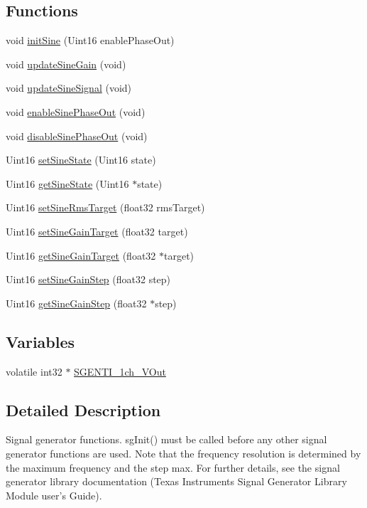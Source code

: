 \subsection*{Functions}
\begin{DoxyCompactItemize}
\item 
void \hyperlink{a00045_a4c050cf5f44fdac62f2260da4d5d6c32}{init\-Sine} (Uint16 enable\-Phase\-Out)
\item 
void \hyperlink{a00045_a5cd2ce3a0a44bf15cce989d0ec28483c}{update\-Sine\-Gain} (void)
\item 
void \hyperlink{a00045_a15cc3f7f606ea48016c591c798a55f15}{update\-Sine\-Signal} (void)
\item 
void \hyperlink{a00045_ab3922b82823a89211338cee98117369c}{enable\-Sine\-Phase\-Out} (void)
\item 
void \hyperlink{a00045_af1add0fec8d10afcd40956d01d01cfa7}{disable\-Sine\-Phase\-Out} (void)
\item 
Uint16 \hyperlink{a00045_a70155ca3a5315917719d943e645e53d6}{set\-Sine\-State} (Uint16 state)
\item 
Uint16 \hyperlink{a00045_a63e4f7727c81ef635e50879433bc03b9}{get\-Sine\-State} (Uint16 $\ast$state)
\item 
Uint16 \hyperlink{a00045_a2604c70758904f640d943151c13ddb9b}{set\-Sine\-Rms\-Target} (float32 rms\-Target)
\item 
Uint16 \hyperlink{a00045_ab40939821b2aba026ef55cf4ec9c12dd}{set\-Sine\-Gain\-Target} (float32 target)
\item 
Uint16 \hyperlink{a00045_a713b866aa5b5636f85d1a1f5f06b4ed3}{get\-Sine\-Gain\-Target} (float32 $\ast$target)
\item 
Uint16 \hyperlink{a00045_ae25f691d4da06e89110ade79a0a4d93b}{set\-Sine\-Gain\-Step} (float32 step)
\item 
Uint16 \hyperlink{a00045_a5ab11b6c0a463f9791e61647c89f5ebe}{get\-Sine\-Gain\-Step} (float32 $\ast$step)
\end{DoxyCompactItemize}
\subsection*{Variables}
\begin{DoxyCompactItemize}
\item 
volatile int32 $\ast$ \hyperlink{a00045_a5dba1fe543c9e62ef6cc8cf4179de951}{S\-G\-E\-N\-T\-I\-\_\-1ch\-\_\-\-V\-Out}
\end{DoxyCompactItemize}


\subsection{Detailed Description}
Signal generator functions. sg\-Init() must be called before any other signal generator functions are used. Note that the frequency resolution is determined by the maximum frequency and the step max. For further details, see the signal generator library documentation (Texas Instruments Signal Generator Library Module user's Guide).

